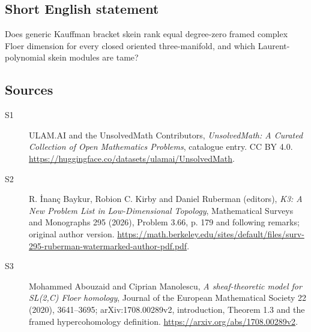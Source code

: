\documentclass[11pt]{article}
\begin{document}
\subsection{Short English statement}
Does generic Kauffman bracket skein rank equal degree-zero framed complex Floer dimension for every closed oriented three-manifold, and which Laurent-polynomial skein modules are tame?
\subsection{Sources}
\begin{description}
\item[\hypertarget{source:statement:1}{S1}] ULAM.AI and the UnsolvedMath Contributors, \emph{UnsolvedMath: A Curated Collection of Open Mathematics Problems}, catalogue entry. CC BY 4.0. \url{https://huggingface.co/datasets/ulamai/UnsolvedMath}.
\item[\hypertarget{source:statement:2}{S2}] R. İnanç Baykur, Robion C. Kirby and Daniel Ruberman (editors), \emph{K3: A New Problem List in Low-Dimensional Topology}, Mathematical Surveys and Monographs 295 (2026), Problem 3.66, p. 179 and following remarks; original author version. \url{https://math.berkeley.edu/sites/default/files/surv-295-ruberman-watermarked-author-pdf.pdf}.
\item[\hypertarget{source:statement:3}{S3}] Mohammed Abouzaid and Ciprian Manolescu, \emph{A sheaf-theoretic model for SL(2,C) Floer homology}, Journal of the European Mathematical Society 22 (2020), 3641--3695; arXiv:1708.00289v2, introduction, Theorem 1.3 and the framed hypercohomology definition. \url{https://arxiv.org/abs/1708.00289v2}.
\end{description}
\label{end:statement}
\end{document}
